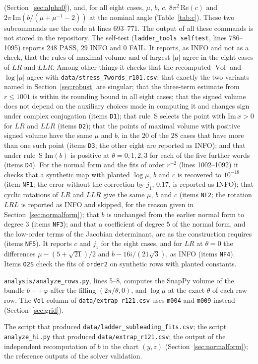 \documentclass[11pt]{amsart}
\theoremstyle{definition}
\theoremstyle{remark}
\newcommand{\Vol}{\operatorname{Vol}}
\begin{document}
\begin{description}
(Section~\ref{sec:alpha0}), and, for all eight cases, $\mu$, $b$, $c$,
$8\pi^2\,\mathrm{Re}(c)$ and $2\pi\,\mathrm{Im}(b/(\mu+\mu^{-1}-2))$ at the nominal
angle (Table~\ref{tab:c}). These two subcommands use the code at lines 693--771. The
output of all these commands is not stored in the repository. The self-test
(\texttt{ladder\_tools selftest}, lines 786--1095)
reports $248$ PASS, $29$ INFO and $0$ FAIL. It reports, as INFO and not as a check, that the rules of
maximal volume and of largest $|\mu|$ agree in the eight cases of $LR$ and $LLR$.
Among other things it checks that
the recomputed $\Vol$ and $\log|\mu|$ agree with \texttt{data/stress\_7words\_r101.csv};
that exactly the two variants named in Section~\ref{sec:robust} are singular; that
the three-term estimate from $r \le 1001$ is within its rounding bound in all eight
cases; that the signed volume does not depend on the auxiliary choices made in
computing it and changes sign under complex conjugation (items \texttt{D1}); that
rule~S selects the point with $\mathrm{Im}\,x > 0$ for $LR$ and $LLR$ (items
\texttt{D2}); that the points of maximal volume with positive signed volume have the
same $\mu$ and $b$, in the $20$ of the $28$ cases that have more than one such point
(items \texttt{D3}; the other eight are reported as INFO); and that under rule~S
$\mathrm{Im}(b)$ is positive at $\theta = 0, 1, 2, 3$ for each of the five further
words (items \texttt{D4}). For the normal form and the fits of order $r^{-2}$ (lines
1002--1092) it checks that a
synthetic map with planted $\log\mu$, $b$ and $c$ is recovered to $10^{-18}$ (item
\texttt{NF1}; the error without the correction by $j_1$, $0.17$, is reported as INFO);
that cyclic rotations of $LR$ and $LLR$ give the same $\mu$, $b$ and $c$ (items
\texttt{NF2}; the rotation $LRL$ is reported as INFO and skipped, for the reason given
in Section~\ref{sec:normalform}); that $b$ is unchanged from the earlier normal form to
degree $3$ (items \texttt{NF3}); and that a coefficient of degree $5$ of the normal
form, and the low-order terms of the Jacobian determinant, are as the construction
requires (items \texttt{NF5}). It reports $c$ and $j_1$ for the eight cases, and for
$LR$ at $\theta = 0$ the differences $\mu - (5+\sqrt{21})/2$ and $b - 16i/(21\sqrt3)$,
as INFO (items \texttt{NF4}). Items \texttt{O2S} check the fits of
\texttt{order2} on synthetic rows with planted constants.
\item[Volumes] \texttt{analysis/analyze\_rows.py}, lines 5--8, computes the SnapPy
volume of the bundle $b{+}{+}\varphi$ after the filling $(2\pi/\theta, 0)$, and
$\log\mu$ at the exact $\theta$ of each raw row. The \texttt{Vol} column of
\texttt{data/extrap\_r121.csv} uses \texttt{m004} and \texttt{m009} instead
(Section~\ref{sec:grid}).
\item[Not kept] The script that produced \texttt{data/ladder\_subleading\_fits.csv};
the script \texttt{analyze\_hi.py} that produced \texttt{data/extrap\_r121.csv}; the
output of the independent recomputation of $b$ in the chart $(y,z)$
(Section~\ref{sec:normalform}); the reference outputs of the solver validation.
\end{description}
\end{document}
